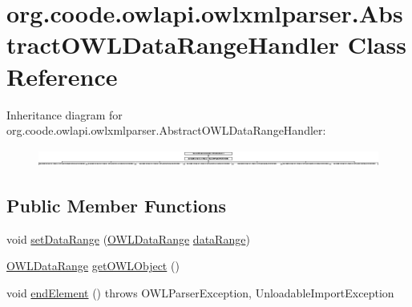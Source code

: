\hypertarget{classorg_1_1coode_1_1owlapi_1_1owlxmlparser_1_1_abstract_o_w_l_data_range_handler}{\section{org.\-coode.\-owlapi.\-owlxmlparser.\-Abstract\-O\-W\-L\-Data\-Range\-Handler Class Reference}
\label{classorg_1_1coode_1_1owlapi_1_1owlxmlparser_1_1_abstract_o_w_l_data_range_handler}
}
Inheritance diagram for org.\-coode.\-owlapi.\-owlxmlparser.\-Abstract\-O\-W\-L\-Data\-Range\-Handler\-:\begin{figure}[H]
\begin{center}
\leavevmode
\includegraphics[height=0.563380cm]{classorg_1_1coode_1_1owlapi_1_1owlxmlparser_1_1_abstract_o_w_l_data_range_handler}
\end{center}
\end{figure}
\subsection*{Public Member Functions}
\begin{DoxyCompactItemize}
\item 
void \hyperlink{classorg_1_1coode_1_1owlapi_1_1owlxmlparser_1_1_abstract_o_w_l_data_range_handler_a336c5a76b40fb29166a1b37cd1965ffe}{set\-Data\-Range} (\hyperlink{interfaceorg_1_1semanticweb_1_1owlapi_1_1model_1_1_o_w_l_data_range}{O\-W\-L\-Data\-Range} \hyperlink{classorg_1_1coode_1_1owlapi_1_1owlxmlparser_1_1_abstract_o_w_l_data_range_handler_ab66c7043a6c6e9950a36e1ed6a0c9546}{data\-Range})
\item 
\hyperlink{interfaceorg_1_1semanticweb_1_1owlapi_1_1model_1_1_o_w_l_data_range}{O\-W\-L\-Data\-Range} \hyperlink{classorg_1_1coode_1_1owlapi_1_1owlxmlparser_1_1_abstract_o_w_l_data_range_handler_a2759d33ad1eb2f10e257c78be93fe155}{get\-O\-W\-L\-Object} ()
\item 
void \hyperlink{classorg_1_1coode_1_1owlapi_1_1owlxmlparser_1_1_abstract_o_w_l_data_range_handler_a46817e9cc1134c10d77db9e75b2e14c5}{end\-Element} ()  throws O\-W\-L\-Parser\-Exception, Unloadable\-Import\-Exception 
\end{DoxyCompactItemize}
